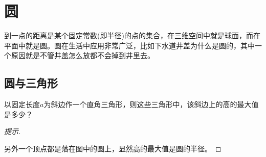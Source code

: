 
\chapter{圆}
\label{chap:circle}

到一点的距离是某个固定常数(即半径)的点的集合，在三维空间中就是球面，而在平面中就是圆。圆在生活中应用非常广泛，比如下水道井盖为什么是圆的，其中一个原因就是不管井盖怎么放都不会掉到井里去。

\section{圆与三角形}
\label{sec:circle-and-triangle}

\begin{example}
  以固定长度$a$为斜边作一个直角三角形，则这些三角形中，该斜边上的高的最大值是多少？
\end{example}
\begin{proof}[提示]\mbox{}\par
  \begin{center}
  \end{center}
  另外一个顶点都是落在图中的圆上，显然高的最大值是圆的半径。
\end{proof}
